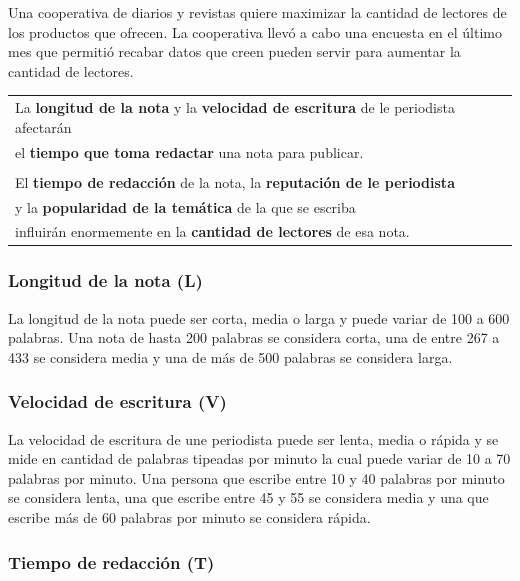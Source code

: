 \documentclass{article}
\begin{document}
Una cooperativa de diarios y revistas quiere maximizar la cantidad de lectores de los productos que ofrecen. La cooperativa llevó a cabo una encuesta en el último mes que permitió recabar datos que creen pueden servir para aumentar la cantidad de lectores.

\begin{center}
	\begin{tabular}{|l}
	La \textbf{longitud de la nota} y la \textbf{velocidad de escritura} de le periodista afectarán\\ el \textbf{tiempo que toma redactar} una nota para publicar.\\\\

	El \textbf{tiempo de redacción} de la nota, la \textbf{reputación de le periodista}\\ y la \textbf{popularidad de la temática} de la que se escriba\\ influirán enormemente en la \textbf{cantidad de lectores} de esa nota.
	\end{tabular}
\end{center}

\subsubsection*{Longitud de la nota (L)}

La longitud de la nota puede ser corta, media o larga y puede variar de 100 a 600 palabras. Una nota de hasta 200 palabras se considera corta, una de entre 267 a 433 se considera media y una de más de 500 palabras se considera larga.

\subsubsection*{Velocidad de escritura (V)}

La velocidad de escritura de une periodista puede ser lenta, media o rápida y se mide en cantidad de palabras tipeadas por minuto la cual puede variar de 10 a 70 palabras por minuto. Una persona que escribe entre 10 y 40 palabras por minuto se considera lenta, una que escribe entre 45 y 55 se considera media y una que escribe más de 60 palabras por minuto se considera rápida.

\subsubsection*{Tiempo de redacción (T)}
\end{document}
